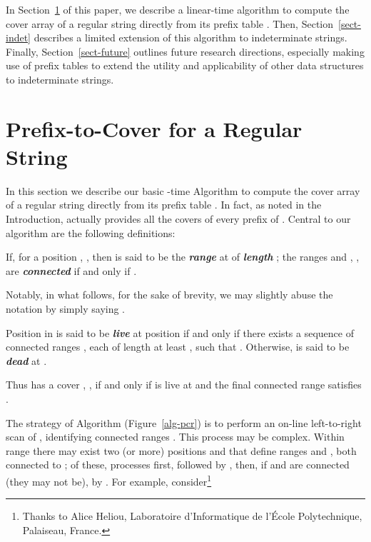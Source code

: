 \documentclass[runningheads,a4paper]{llncs}
\def\s#1{\mbox{\boldmath }}
\def\itbf#1{\textit{\textbf{#1}}}
\begin{document}
In Section~\ref{sect-pcr} of this paper, we describe a linear-time
algorithm to compute the cover array \s{\gamma}
of a regular string \s{x} directly from its prefix table \s{\pi}. Then,
Section~\ref{sect-indet} describes a limited extension of this algorithm to
indeterminate strings.
Finally, Section~\ref{sect-future} outlines future research directions,
especially making use of prefix tables to extend the utility and applicability
of other data structures to indeterminate strings.

\section{Prefix-to-Cover for a Regular String}\label{sect-pcr}
In this section we describe our basic -time Algorithm  to
compute the cover array  of a regular string
 directly from its prefix table .
In fact, as noted in the Introduction, \s{\gamma} actually provides
all the covers of every prefix of \s{x}.
Central to our algorithm are the following definitions:

\begin{definition}\label{defn-range}
If, for a position , ,
then  is said to be
the \itbf{range} at  of \itbf{length} ;
the ranges  and , , are \itbf{connected}
if and only if .
\end{definition}
 
Notably, in what follows, for the sake of brevity, we may slightly abuse the
notation  by simply saying .

\begin{definition}\label{defn-live}
Position  in \s{\pi} is said to be \itbf{live} at position  if and only if
there exists a sequence of  connected ranges
, each of length at least , such that
.
Otherwise,  is said to be \itbf{dead} at .
\end{definition}

Thus  has a cover , , if and only if
 is live at  and the final connected range 
satisfies .

The strategy of Algorithm  (Figure~\ref{alg-pcr})
is to perform an on-line left-to-right scan of \s{\pi},
identifying connected ranges .
This process may be complex.
Within range  there may exist two (or more) positions  and 
that define ranges  and , both connected to ;
of these,  processes  first, followed by ,
then, if  and  are connected (they may not be),
by .
For example, consider\footnote{Thanks to Alice Heliou,
Laboratoire d'Informatique de l'\'{E}cole Polytechnique, Palaiseau, France.}
\end{document}
